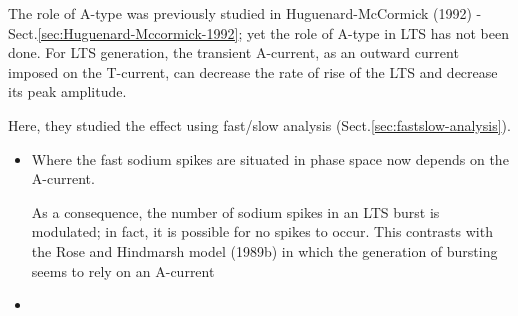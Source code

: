 The role of A-type was previously studied in Huguenard-McCormick (1992) -
Sect.\ref{sec:Huguenard-Mccormick-1992}; yet the role of A-type in LTS has not
been done. For LTS generation, the transient A-current, as an outward current
imposed on the T-current, can decrease the rate of rise of the LTS and decrease
its peak amplitude.

Here, they studied the effect using fast/slow analysis
(Sect.\ref{sec:fastslow-analysis}).
\begin{itemize} 
  \item  Where the fast sodium spikes are situated in phase space now depends on
the A-current.

As a consequence, the number of sodium spikes in an LTS burst is modulated; in
fact, it is possible for no spikes to occur. This contrasts with the Rose and
Hindmarsh model (1989b) in which the generation of bursting seems to rely on an
A-current

  \item 
\end{itemize}











